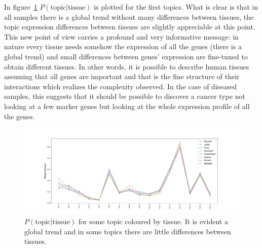 In figure~\ref{fig:topic/merged/lifeplot} $P(\text{topic}| \text{tissue})$ is plotted for the first topics. What is clear is that in all samples there is a global trend without many differences between tissues, the topic expression differences between tissues are slightly appreciable at this point. This new point of view carries a profound and very informative message: in nature every tissue needs somehow the expression of all the genes (there is a global trend) and small differences between genes' expression are fine-tuned to obtain different tissues. In other words, it is possible to describe human tissues assuming that all genes are important and that is the fine structure of their interactions which realizes the complexity observed. In the case of diseased samples, this suggests that it should be possible to discover a cancer type not looking at a few marker genes but looking at the whole expression profile of all the genes.
\begin{figure}[htb!]
	\centering
	\includegraphics[width=0.95\linewidth]{pictures/topic/merged/lifeplot.pdf}
	\caption{$P(\text{topic} | \text{tissue})$ for some topic coloured by tissue. It is evident a global trend and in some topics there are little differences between tissues.}
	\label{fig:topic/merged/lifeplot}
\end{figure}

